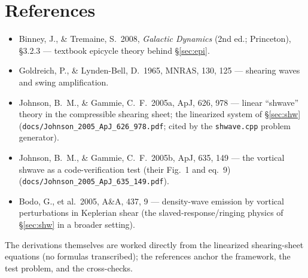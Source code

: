 \documentclass[11pt]{article}
\begin{document}
\section*{References}
\begin{itemize}
\item[] Binney, J., \& Tremaine, S.\ 2008, \emph{Galactic Dynamics} (2nd ed.;
  Princeton), \S3.2.3 --- textbook epicycle theory behind \S\ref{sec:epi}.
\item[] Goldreich, P., \& Lynden-Bell, D.\ 1965, MNRAS, 130, 125 --- shearing
  waves and swing amplification.
\item[] Johnson, B.~M., \& Gammie, C.~F.\ 2005a, ApJ, 626, 978 --- linear
  ``shwave'' theory in the compressible shearing sheet; the linearized system of
  \S\ref{sec:shw} (\texttt{docs/Johnson\_2005\_ApJ\_626\_978.pdf}; cited by the
  \texttt{shwave.cpp} problem generator).
\item[] Johnson, B.~M., \& Gammie, C.~F.\ 2005b, ApJ, 635, 149 --- the vortical
  shwave as a code-verification test (their Fig.~1 and eq.~9)
  (\texttt{docs/Johnson\_2005\_ApJ\_635\_149.pdf}).
\item[] Bodo, G., et al.\ 2005, A\&A, 437, 9 --- density-wave emission by
  vortical perturbations in Keplerian shear (the slaved-response/ringing physics
  of \S\ref{sec:shw} in a broader setting).
\end{itemize}
\medskip
\noindent The derivations themselves are worked directly from the linearized
shearing-sheet equations (no formulas transcribed); the references anchor the
framework, the test problem, and the cross-checks.
\end{document}
